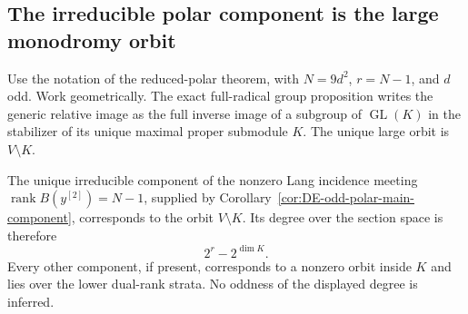 \subsection*{The irreducible polar component is the large monodromy orbit}

Use the notation of the reduced-polar theorem, with
\(N=9d^2\), \(r=N-1\), and \(d\) odd. Work geometrically.
The exact full-radical group proposition writes the generic relative
image as the full inverse image of a subgroup of
\(\operatorname{GL}(K)\) in the stabilizer of its unique maximal
proper submodule \(K\). The unique large orbit is \(V\setminus K\).

\begin{lemma}
\label{lem:DE-Lang-main-orbit}
The unique irreducible component of the nonzero Lang incidence meeting
\(\operatorname{rank}B(y^{[2]})=N-1\), supplied by
Corollary~\ref{cor:DE-odd-polar-main-component}, corresponds to the
orbit \(V\setminus K\). Its degree over the section space is therefore
\[
                             2^r-2^{\dim K}.
\]
Every other component, if present, corresponds to a nonzero orbit
inside \(K\) and lies over the lower dual-rank strata. No oddness of
the displayed degree is inferred.
\end{lemma}
